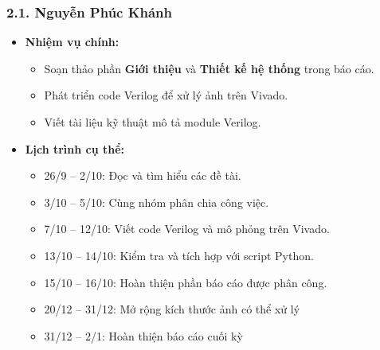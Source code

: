 \subsubsection*{2.1. Nguyễn Phúc Khánh}
\begin{itemize}
    \item \textbf{Nhiệm vụ chính:}
    \begin{itemize}
        \item Soạn thảo phần \textbf{Giới thiệu} và \textbf{Thiết kế hệ thống} trong báo cáo.
        \item Phát triển code Verilog để xử lý ảnh trên Vivado.
        \item Viết tài liệu kỹ thuật mô tả module Verilog.
    \end{itemize}
    \item \textbf{Lịch trình cụ thể:}
    \begin{itemize}
        \item 26/9 -- 2/10: Đọc và tìm hiểu các đề tài.
        \item 3/10 -- 5/10: Cùng nhóm phân chia công việc.
        \item 7/10 -- 12/10: Viết code Verilog và mô phỏng trên Vivado.
        \item 13/10 -- 14/10: Kiểm tra và tích hợp với script Python.
        \item 15/10 -- 16/10: Hoàn thiện phần báo cáo được phân công.
        \item 20/12 -- 31/12: Mở rộng kích thước ảnh có thể xử lý
        \item 31/12 -- 2/1: Hoàn thiện báo cáo cuối kỳ
    \end{itemize}
\end{itemize}

